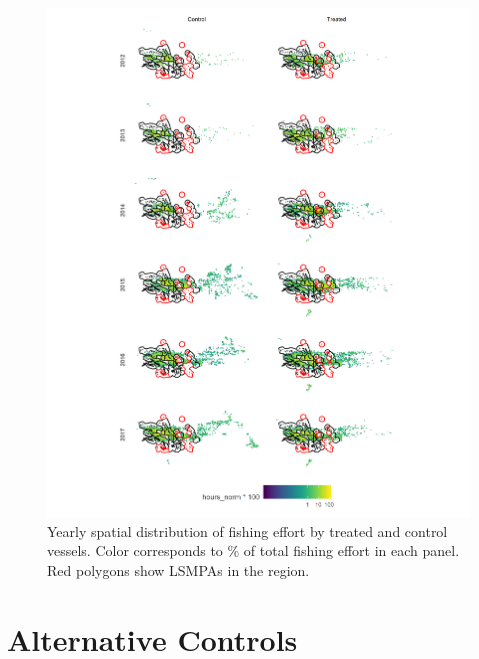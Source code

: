 \documentclass[9p,twocolumn,twoside,lineno]{pnas-new}
\begin{document}
\begin{figure}
\centering
\includegraphics{img/fishing_raster.png}
\caption{\label{fig:fishing_raster}Yearly spatial distribution of fishing effort by treated and control vessels. Color corresponds to \% of total fishing effort in each panel. Red polygons show LSMPAs in the region.}

\end{figure}

\clearpage

\section{Alternative Controls}

\end{document}
